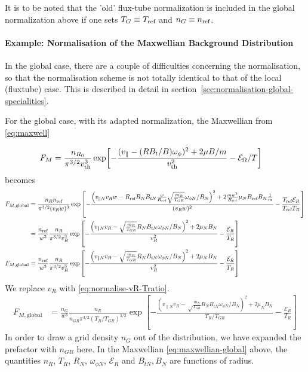 
It is to be noted that the 'old' flux-tube normalization is included in the global normalization above if one sets $T_G \equiv T_{\text{ref}}$ and $n_G \equiv n_{\text{ref}}$.

\paragraph{Example: Normalisation of the Maxwellian Background Distribution} 
\label{sec:global-normalisation}
In the global case, there are a couple of difficulties concerning the normalisation, so that the normalisation scheme is not totally identical to that of the local (fluxtube) case.
This is described in detail in section~\ref{sec:normalisation-global-specialities}.

For the global case, with its adapted normalization, the Maxwellian from \eqref{eq:maxwell} 

\begin{align} 
F_{M} &= {n_{R_0} \over \pi^{3/2} v_{\rm th}^3 } \exp 
\biggl [ - {(v_\parallel-(R B_t/B)\omega_\phi )^2 + 2 \mu B / m \over v_{\rm th}^2} - \mathcal{E}_\Omega/T \biggr ]
\end{align}
becomes  
\begin{align}
  F_{M,\mathrm{global}} 
 &=\frac{n_Rn_{\text{ref}} }{ \pi^{3/2} (v_Rw)^{3} } \exp \left [ - \frac{ 
\left(v_{\parallel N}v_Rw - R_{\text{ref}} R_N B_{tN} \frac{w}{R_{\text{ref}}}\sqrt\frac{m_R}{T_{GR}}\omega_{\phi N} / B_N\right)^2 + 2 \frac{mw^2}{B_{\text{ref}}}\mu_N B_{\text{ref}} B_N\frac{1}{m} 
}{ (v_R w)^2}
- 
\frac{T_{\text{ref}}\mathcal{E}_R}{T_{\text{ref}} T_R}  \right ] 
\nonumber\\
 &=\frac{n_{\text{ref}}}{w^3} \frac{n_R }{ \pi^{3/2} v_R^3 } \exp \left [ - \frac{ 
\left(v_{\parallel N}v_R - \sqrt\frac{m_R}{T_{GR}}R_N B_{tN} \omega_{\phi N} / B_N\right)^2 + 2 \mu_N B_N
}{ v_R ^2}
- 
\frac{\mathcal{E}_R}{T_R}  \right ] 
\\
F_{M,\mathrm{global}}&=\frac{n_{\text{ref}}}{w^3} \frac{n_R }{ \pi^{3/2} v_R^3 } \exp \left [ - \frac{ 
\left(v_{\parallel N}v_R - \sqrt\frac{m_R}{T_{GR}}R_N B_{tN} \omega_{\phi N} / B_N\right)^2 + 2 \mu_N B_N
}{ v_R ^2}
- 
\frac{\mathcal{E}_R}{T_R}  \right ] 
\end{align}
We replace $v_R$ with \eqref{eq:normalise-vR-Tratio}.
\begin{align}
  F_{M,\mathrm{global}}&=\frac{n_G}{w^3}\frac{n_R }{n_{GR} \pi^{3/2} (T_R/T_{GR})^{3/2} } \exp \left [ - \frac{ 
\left(v_{\parallel N}v_R - \sqrt\frac{m_R}{T_{GR}}R_N B_{tN} \omega_{\phi N} / B_N\right)^2 + 2 \mu_N B_N
}{ T_R/T_{GR}}
- 
\frac{\mathcal{E}_R}{T_R}  \right ] 
\label{eq:maxwellian-global}
\end{align}
In order to draw a grid density $n_G$ out of the distribution, we have expanded the prefactor with $n_{GR}$ here.
In the Maxwellian \eqref{eq:maxwellian-global} above, the quantities
$n_R$, $T_R$, $R_N$, $\omega_{\phi N}$, $\mathcal{E}_R$ and
$B_{tN},B_N$ are functions of radius.

